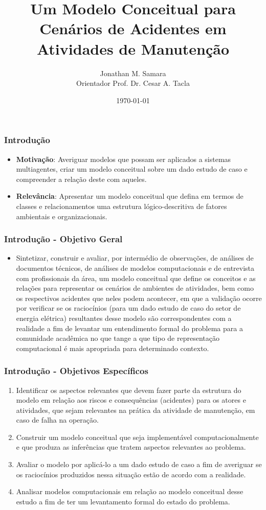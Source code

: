\documentclass{beamer}
\title{Um Modelo Conceitual para Cenários de Acidentes em Atividades de Manutenção} %
\author{Jonathan M. Samara \\ Orientador Prof. Dr. Cesar A. Tacla} %
\institute[UTFPR] %
{
Universidade Tecnológica Federal do Paraná \\ %
\medskip
}
\date{\today} %
\begin{document}
\begin{frame}
\titlepage %
\end{frame}

\begin{frame}
\frametitle{Introdução} %
	\begin{itemize}
			\item \textbf{Motivação}: Averiguar modelos que possam ser aplicados a sistemas multiagentes, criar um modelo conceitual sobre um dado estudo de caso e compreender a relação deste com aqueles. 
			\item \textbf{Relevância}: Apresentar um modelo conceitual que defina em termos de classes e relacionamentos uma estrutura lógico-descritiva de fatores ambientais e organizacionais.    
	\end{itemize}
\end{frame}


\begin{frame}
\frametitle{Introdução - Objetivo Geral} %
	\begin{itemize}
		\item Sintetizar, construir e avaliar, por intermédio de observações, de análises de documentos técnicos, de análises de modelos computacionais e de entrevista com profissionais da área, um modelo conceitual que define os conceitos e as relações para representar os cenários de ambientes de atividades, bem como os respectivos acidentes que neles podem acontecer, em que a validação ocorre por verificar se os raciocínios (para um dado estudo de caso do setor de energia elétrica) resultantes desse modelo são correspondentes com a realidade a fim de levantar um entendimento formal do problema para a comunidade acadêmica no que tange a que tipo de representação computacional é mais apropriada para determinado contexto. 
	\end{itemize}
\end{frame}

\begin{frame}
\frametitle{Introdução - Objetivos Específicos}
	\begin{enumerate}
    	\item Identificar os aspectos relevantes que devem fazer parte da estrutura do modelo em relação aos 	riscos e consequências (acidentes) para os atores e atividades, que sejam relevantes na prática da 	atividade de manutenção, em caso de falha na operação. 
    	\item Construir um modelo conceitual que seja implementável computacionalmente e que produza as 	inferências que tratem aspectos relevantes ao problema.
    	\item Avaliar o modelo por aplicá-lo a um dado estudo de caso a fim de averiguar se os raciocínios 	produzidos nessa situação estão de acordo com a realidade.  
    	\item Analisar modelos computacionais em relação ao modelo conceitual desse estudo a fim de ter um 	levantamento formal do estado do problema. 
	\end{enumerate}
\end{frame}
\end{document}
